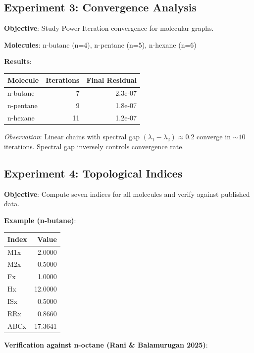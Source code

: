 \documentclass[12pt]{article}
\begin{document}
\subsection{Experiment 3: Convergence Analysis}

\textbf{Objective}: Study Power Iteration convergence for molecular graphs.

\textbf{Molecules}: n-butane (n=4), n-pentane (n=5), n-hexane (n=6)

\textbf{Results}:

\begin{table}[H]
\centering
\begin{tabular}{|l|r|r|}
\hline
\textbf{Molecule} & \textbf{Iterations} & \textbf{Final Residual} \\
\hline
n-butane & 7 & 2.3e-07 \\
n-pentane & 9 & 1.8e-07 \\
n-hexane & 11 & 1.2e-07 \\
\hline
\end{tabular}
\end{table}

\textit{Observation}: Linear chains with spectral gap $(\lambda_1 - \lambda_2) \approx 0.2$ converge in $\sim 10$ iterations. Spectral gap inversely controls convergence rate.

\subsection{Experiment 4: Topological Indices}

\textbf{Objective}: Compute seven indices for all molecules and verify against published data.

\textbf{Example (n-butane)}:

\begin{table}[H]
\centering
\begin{tabular}{|l|r|}
\hline
\textbf{Index} & \textbf{Value} \\
\hline
M1x & 2.0000 \\
M2x & 0.5000 \\
Fx & 1.0000 \\
Hx & 12.0000 \\
ISx & 0.5000 \\
RRx & 0.8660 \\
ABCx & 17.3641 \\
\hline
\end{tabular}
\end{table}

\textbf{Verification against n-octane (Rani \& Balamurugan 2025)}:
\end{document}
